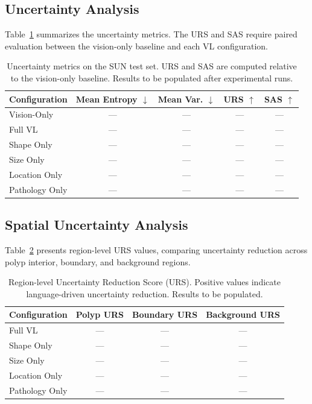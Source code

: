 \subsection{Uncertainty Analysis}
\label{sec:eval:unc_results}

Table~\ref{tab:uncertainty_results} summarizes the uncertainty metrics. The \ac{URS} and \ac{SAS} require paired evaluation between the vision-only baseline and each \ac{VL} configuration.

\begin{table}[htbp]
	\caption{Uncertainty metrics on the SUN test set. URS and SAS are computed relative to the vision-only baseline. Results to be populated after experimental runs.}
	\label{tab:uncertainty_results}
	\centering
	\begin{tabular}{lcccc}
		\toprule
		\textbf{Configuration} & \textbf{Mean Entropy} $\downarrow$ & \textbf{Mean Var.} $\downarrow$ & \textbf{URS} $\uparrow$ & \textbf{SAS} $\uparrow$ \\
		\midrule
		Vision-Only      & ---    & ---    & ---   & ---   \\
		Full VL          & ---    & ---    & ---   & ---   \\
		Shape Only       & ---    & ---    & ---   & ---   \\
		Size Only        & ---    & ---    & ---   & ---   \\
		Location Only    & ---    & ---    & ---   & ---   \\
		Pathology Only   & ---    & ---    & ---   & ---   \\
		\bottomrule
	\end{tabular}
\end{table}


\subsection{Spatial Uncertainty Analysis}
\label{sec:eval:spatial}

Table~\ref{tab:spatial_urs} presents region-level URS values, comparing uncertainty reduction across polyp interior, boundary, and background regions.

\begin{table}[htbp]
	\caption{Region-level Uncertainty Reduction Score (URS). Positive values indicate language-driven uncertainty reduction. Results to be populated.}
	\label{tab:spatial_urs}
	\centering
	\begin{tabular}{lccc}
		\toprule
		\textbf{Configuration} & \textbf{Polyp URS} & \textbf{Boundary URS} & \textbf{Background URS} \\
		\midrule
		Full VL        & ---   & ---   & ---   \\
		Shape Only     & ---   & ---   & ---   \\
		Size Only      & ---   & ---   & ---   \\
		Location Only  & ---   & ---   & ---   \\
		Pathology Only & ---   & ---   & ---   \\
		\bottomrule
	\end{tabular}
\end{table}


